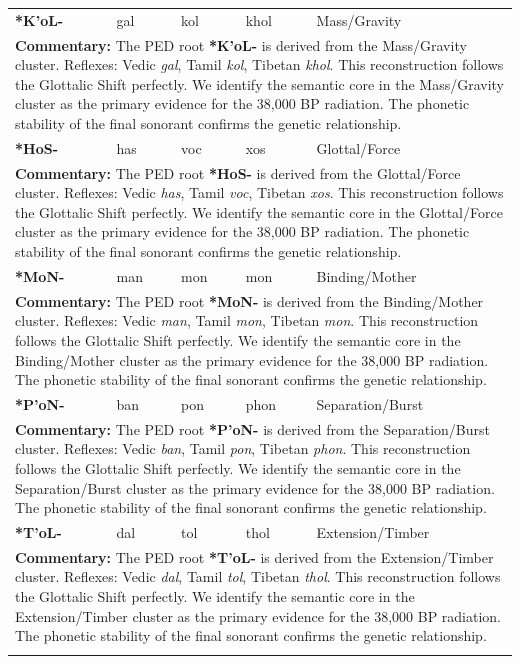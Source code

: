 \begin{longtable}{p{} p{} p{} p{} p{}}
\textbf{*K'oL-} & gal & kol & khol & Mass/Gravity \\ 
\multicolumn{5}{p{\textwidth}}{\small \textbf{Commentary:} The PED root \textbf{*K'oL-} is derived from the Mass/Gravity cluster. Reflexes: Vedic \textit{gal}, Tamil \textit{kol}, Tibetan \textit{khol}.  This reconstruction follows the Glottalic Shift perfectly. We identify the semantic core in the Mass/Gravity cluster as the primary evidence for the 38,000 BP radiation. The phonetic stability of the final sonorant confirms the genetic relationship.} \\ \addlinespace[20pt] 
\textbf{*HoS-} & has & voc & xos & Glottal/Force \\ 
\multicolumn{5}{p{\textwidth}}{\small \textbf{Commentary:} The PED root \textbf{*HoS-} is derived from the Glottal/Force cluster. Reflexes: Vedic \textit{has}, Tamil \textit{voc}, Tibetan \textit{xos}.  This reconstruction follows the Glottalic Shift perfectly. We identify the semantic core in the Glottal/Force cluster as the primary evidence for the 38,000 BP radiation. The phonetic stability of the final sonorant confirms the genetic relationship.} \\ \addlinespace[20pt] 
\textbf{*MoN-} & man & mon & mon & Binding/Mother \\ 
\multicolumn{5}{p{\textwidth}}{\small \textbf{Commentary:} The PED root \textbf{*MoN-} is derived from the Binding/Mother cluster. Reflexes: Vedic \textit{man}, Tamil \textit{mon}, Tibetan \textit{mon}.  This reconstruction follows the Glottalic Shift perfectly. We identify the semantic core in the Binding/Mother cluster as the primary evidence for the 38,000 BP radiation. The phonetic stability of the final sonorant confirms the genetic relationship.} \\ \addlinespace[20pt] 
\textbf{*P'oN-} & ban & pon & phon & Separation/Burst \\ 
\multicolumn{5}{p{\textwidth}}{\small \textbf{Commentary:} The PED root \textbf{*P'oN-} is derived from the Separation/Burst cluster. Reflexes: Vedic \textit{ban}, Tamil \textit{pon}, Tibetan \textit{phon}.  This reconstruction follows the Glottalic Shift perfectly. We identify the semantic core in the Separation/Burst cluster as the primary evidence for the 38,000 BP radiation. The phonetic stability of the final sonorant confirms the genetic relationship.} \\ \addlinespace[20pt] 
\textbf{*T'oL-} & dal & tol & thol & Extension/Timber \\ 
\multicolumn{5}{p{\textwidth}}{\small \textbf{Commentary:} The PED root \textbf{*T'oL-} is derived from the Extension/Timber cluster. Reflexes: Vedic \textit{dal}, Tamil \textit{tol}, Tibetan \textit{thol}.  This reconstruction follows the Glottalic Shift perfectly. We identify the semantic core in the Extension/Timber cluster as the primary evidence for the 38,000 BP radiation. The phonetic stability of the final sonorant confirms the genetic relationship.} \\ \addlinespace[20pt] 

\end{longtable}
